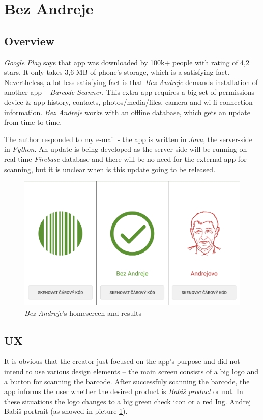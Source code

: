 \documentclass[12pt]{article} %
\begin{document}
\section{Bez Andreje}
\subsection{Overview}
\textit{Google Play} says that app was downloaded by 100k+ people with rating of 4,2 stars. It only takes 3,6 MB of phone’s storage, which is a satisfying fact. Nevertheless, a lot less satisfying fact is that \textit{Bez Andreje} demands installation of another app – \textit{Barcode Scanner}. 
\newpage
This extra app requires a big set of permissions - device \& app history, contacts, photos/media/files, camera and wi-fi connection information. \textit{Bez Andreje} works with an offline database, which gets an update from time to time.

The author responded to my e-mail - the app is written in \textit{Java}, the server-side in \textit{Python}. An update is being developed as the server-side will be running on real-time \textit{Firebase} database and there will be no need for the external app for scanning, but it is unclear when is this update going to be released.

\begin{figure}[h]
	\centering
	\includegraphics[width=.9\linewidth]{bez_andreje.jpg}
	\caption{\textit{Bez Andreje}'s homescreen and results}
	\label{fig:bezandreje}
\end{figure}
\subsection{UX}
It is obvious that the creator just focused on the app’s purpose and did not intend to use various design elements – the main screen consists of a big logo and a button for scanning the barcode. After successfuly scanning the barcode, the app informs the user whether the desired product is \textit{Babiš product} or not. In these situations the logo changes to a big green check icon or a red Ing. Andrej Babiš portrait (as showed in picture \ref{fig:bezandreje}).
\end{document}
